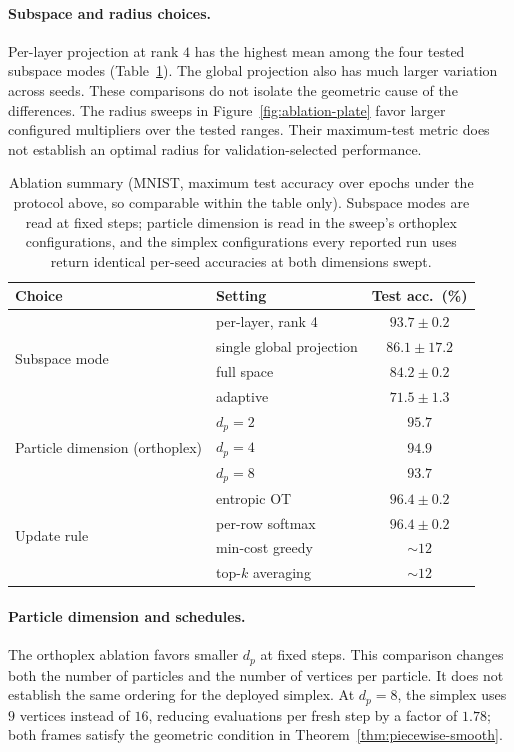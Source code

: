 \paragraph{Subspace and radius choices.}
Per-layer projection at rank $4$ has the highest mean among the four tested
subspace modes (Table~\ref{tab:ablation-summary}). The global projection
also has much larger variation across seeds. These comparisons do not
isolate the geometric cause of the differences. The radius sweeps in
Figure~\ref{fig:ablation-plate} favor larger configured multipliers over
the tested ranges. Their maximum-test metric does not establish an optimal
radius for validation-selected performance.

\begin{table}[t]
\centering
\caption{Ablation summary (MNIST, maximum test accuracy over epochs under the protocol above, so comparable within the table only). Subspace modes are read at fixed steps; particle dimension is read in the sweep's orthoplex configurations, and the simplex configurations every reported run uses return identical per-seed accuracies at both dimensions swept.}
\label{tab:ablation-summary}
\small
\begin{tabular}{@{}llc@{}}
\toprule
Choice & Setting & Test acc.\ (\%) \\
\midrule
\multirow{4}{*}{Subspace mode}
 & per-layer, rank 4 & $\mathbf{93.7 \pm 0.2}$ \\
 & single global projection & $86.1 \pm 17.2$ \\
 & full space & $84.2 \pm 0.2$ \\
 & adaptive & $71.5 \pm 1.3$ \\
\midrule
\multirow{3}{*}{Particle dimension (orthoplex)}
 & $d_p = 2$ & $\mathbf{95.7}$ \\
 & $d_p = 4$ & $94.9$ \\
 & $d_p = 8$ & $93.7$ \\
\midrule
\multirow{4}{*}{Update rule}
 & entropic OT & $\mathbf{96.4 \pm 0.2}$ \\
 & per-row softmax & $\mathbf{96.4 \pm 0.2}$ \\
 & min-cost greedy & ${\sim}12$ \\
 & top-$k$ averaging & ${\sim}12$ \\
\bottomrule
\end{tabular}
\end{table}

\paragraph{Particle dimension and schedules.}
The orthoplex ablation favors smaller $d_p$ at fixed steps. This comparison
changes both the number of particles and the number of vertices per particle.
It does not establish the same ordering for the deployed simplex. At $d_p=8$,
the simplex uses $9$ vertices instead of $16$, reducing evaluations per
fresh step by a factor of $1.78$; both frames satisfy the geometric
condition in Theorem~\ref{thm:piecewise-smooth}.

